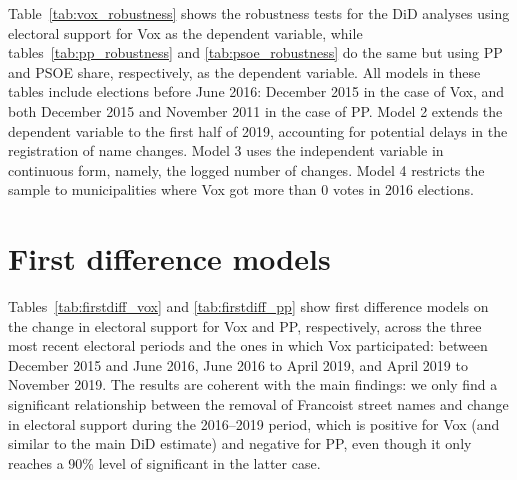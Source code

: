 \documentclass[12pt, titlepage]{article}
\begin{document}
Table~\ref{tab:vox_robustness} shows the robustness tests for the DiD analyses using electoral support for Vox as the dependent variable, while tables~\ref{tab:pp_robustness} and \ref{tab:psoe_robustness} do the same but using PP and PSOE share, respectively, as the dependent variable.
All models in these tables include elections before June 2016: December 2015 in the case of Vox, and both December 2015 and November 2011 in the case of PP.
Model 2 extends the dependent variable to the first half of 2019, accounting for potential delays in the registration of name changes.
Model 3 uses the independent variable in continuous form, namely, the logged number of changes.
Model 4 restricts the sample to municipalities where Vox got more than 0 votes in 2016 elections.
\textbf{{\color{red}{DISCUSS}}}





\clearpage
\section{First difference models}

Tables~\ref{tab:firstdiff_vox} and \ref{tab:firstdiff_pp} show first difference models on the change in electoral support for Vox and PP, respectively, across the three most recent electoral periods and the ones in which Vox participated: between December 2015 and June 2016, June 2016 to April 2019, and April 2019 to November 2019.
The results are coherent with the main findings: we only find a significant relationship between the removal of Francoist street names and change in electoral support during the 2016--2019 period, which is positive for Vox (and similar to the main DiD estimate) and negative for PP, even though it only reaches a 90\% level of significant in the latter case.



\end{document}
